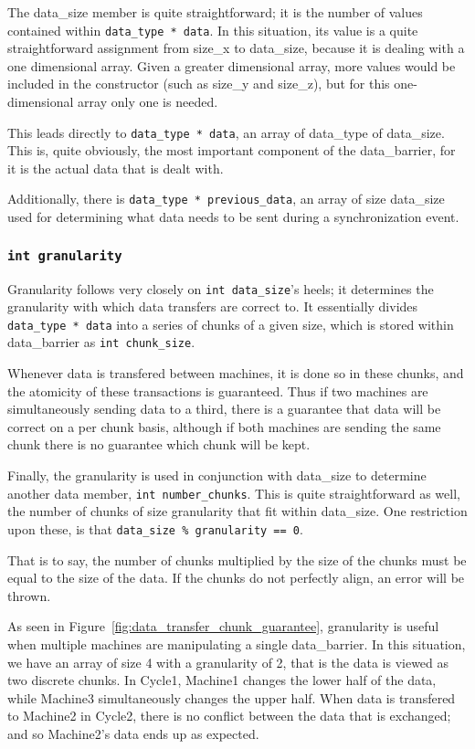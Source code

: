 \documentclass[thesis.tex]{subfiles}
\begin{document}
      The data\_size member is quite straightforward; it is the number of values contained within \texttt{data\_type * data}. In this situation, its value is a quite straightforward assignment from size\_x to data\_size, because it is dealing with a one dimensional array. Given a greater dimensional array, more values would be included in the constructor (such as size\_y and size\_z), but for this one-dimensional array only one is needed.

      This leads directly to \texttt{data\_type * data}, an array of data\_type of data\_size. This is, quite obviously, the most important component of the data\_barrier, for it is the actual data that is dealt with.

      Additionally, there is \texttt{data\_type * previous\_data}, an array of size data\_size used for determining what data needs to be sent during a synchronization event.

  \subsubsection{\texttt{int granularity}} %
  \label{ssub:int_granularity}
    Granularity follows very closely on \texttt{int data\_size}'s heels; it determines the granularity with which data transfers are correct to. It essentially divides \texttt{data\_type * data} into a series of chunks of a given size, which is stored within data\_barrier as \texttt{int chunk\_size}.

    Whenever data is transfered between machines, it is done so in these chunks, and the atomicity of these transactions is guaranteed. Thus if two machines are simultaneously sending data to a third, there is a guarantee that data will be correct on a per chunk basis, although if both machines are sending the same chunk there is no guarantee which chunk will be kept.

    Finally, the granularity is used in conjunction with data\_size to determine another data member, \texttt{int number\_chunks}. This is quite straightforward as well, the number of chunks of size granularity that fit within data\_size. One restriction upon these, is that \texttt{data\_size \% granularity == 0}.

    That is to say, the number of chunks multiplied by the size of the chunks must be equal to the size of the data. If the chunks do not perfectly align, an error will be thrown.
 
    As seen in Figure~\ref{fig:data_transfer_chunk_guarantee}, granularity is useful when multiple machines are manipulating a single data\_barrier. In this situation, we have an array of size 4 with a granularity of 2, that is the data is viewed as two discrete chunks. In Cycle1, Machine1 changes the lower half of the data, while Machine3 simultaneously changes the upper half. When data is transfered to Machine2 in Cycle2, there is no conflict between the data that is exchanged; and so Machine2's data ends up as expected.
\end{document}

